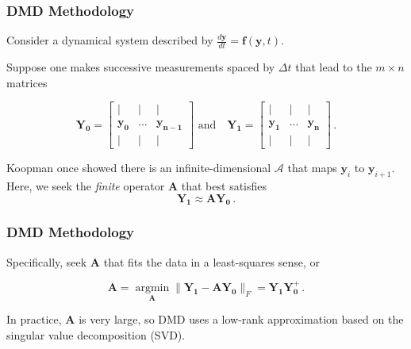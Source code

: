\documentclass[fleqn]{beamer}
\DeclareMathOperator*{\argmin}{argmin}
\renewcommand{\vec}[1]{\bm{#1}} %
\begin{document}
\begin{frame}
\frametitle {DMD Methodology}

Consider a dynamical system described by $\frac{d\mathbf{y}}{dt} = \mathbf{f}(\mathbf{y}, t)$. 

\vfill 
\pause

Suppose one makes successive measurements spaced by $\Delta t$ that lead to the $m\times n$ matrices

\begin{equation*}
\mathbf{Y_0}=\left[\begin{array}{ccc}
| & |   & | \\
{\vec{y_0}} &   ... & {\vec{y_{n-1}}} \\ 
| & | &  | 
\end{array} \right] 
 \,\, \text{and} \quad
{\mathbf{Y_1}}=
\left[\begin{array}{ccc}
| & |  & | \\ 
{\vec{y_1}} & ... & {\vec{y_{n}}} \\ 
| & |  & |
\end{array} \right]\, .
\end{equation*}

\vfill 
\pause

Koopman once showed there is an infinite-dimensional $\mathcal{A}$ that maps $\mathbf{y}_{i}$ to $\mathbf{y}_{i+1}$.  
Here, we seek the {\it finite} operator $\mathbf{A}$ that best satisfies
\begin{equation*}
   \mathbf{Y_1} \approx \mathbf{A} \mathbf{Y_0} \, .
\end{equation*}

\end{frame}

\begin{frame}
\frametitle{DMD Methodology}

Specifically, seek $\mathbf{A}$ that fits the data in a least-squares sense, or 

\begin{equation*}
\mathbf{A}=\argmin\limits_{\mathbf{A}}\|\mathbf{Y_{1}} -\mathbf{AY_{0}}\|_F = \mathbf{Y_1}\mathbf{Y_0^{+}} \, .
\end{equation*}

\vfill 
\pause
 
In practice, $\mathbf{A}$  is very large, so DMD uses a low-rank approximation based on the singular value decomposition (SVD).
\vfill
\end{frame}
\end{document}
